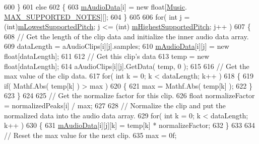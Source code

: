 \begin{DoxyCode}
600                 \}
601                 \textcolor{keywordflow}{else}
602                 \{
603                     \hyperlink{group___v_i_base_pro_var_ga52e76d9b74408660584676035a92a2c6}{mAudioData}[i] = \textcolor{keyword}{new} \textcolor{keywordtype}{float}[\hyperlink{class_music}{Music}.
      \hyperlink{group___music_constants_gaaf07da909a12e9fec0e43b70864f27b7}{MAX\_SUPPORTED\_NOTES}][];
604                 \}
605 
606                 \textcolor{keywordflow}{for}( \textcolor{keywordtype}{int} j = (\textcolor{keywordtype}{int})\hyperlink{group___v_i_base_pro_var_ga3cae52b1bcc0178a8a6b03c7aaf7aac8}{mLowestSupportedPitch}; j <= (int)
      \hyperlink{group___v_i_base_pro_var_ga61fb2c33b53a0f663047779d7ceb18f3}{mHighestSupportedPitch}; j++ )
607                 \{
608                     \textcolor{comment}{// Get the length of the clip data and initialize the inner audio data array. }
609                     dataLength = aAudioClips[i][j].samples;
610                     \hyperlink{group___v_i_base_pro_var_ga52e76d9b74408660584676035a92a2c6}{mAudioData}[i][j] = \textcolor{keyword}{new} \textcolor{keywordtype}{float}[dataLength];
611 
612                     \textcolor{comment}{// Get this clip's data}
613                     temp = \textcolor{keyword}{new} \textcolor{keywordtype}{float}[dataLength];
614                     aAudioClips[i][j].GetData( temp, 0 );
615 
616                     \textcolor{comment}{// Get the max value of the clip data.}
617                     \textcolor{keywordflow}{for}( \textcolor{keywordtype}{int} k = 0; k < dataLength; k++ )
618                     \{
619                         \textcolor{keywordflow}{if}( Mathf.Abs( temp[k] ) > max )
620                         \{
621                             max = Mathf.Abs( temp[k] );
622                         \}
623                     \}
624 
625                     \textcolor{comment}{// Get the normalize factor for this clip.}
626                     \textcolor{keywordtype}{float} normalizeFactor = normalizedPeaks[i] / max;
627 
628                     \textcolor{comment}{// Normalize the clip and put the normalized data into the audio data array.}
629                     \textcolor{keywordflow}{for}( \textcolor{keywordtype}{int} k = 0; k < dataLength; k++ )
630                     \{
631                         \hyperlink{group___v_i_base_pro_var_ga52e76d9b74408660584676035a92a2c6}{mAudioData}[i][j][k] = temp[k] * normalizeFactor;
632                     \}
633 
634                     \textcolor{comment}{// Reset the max value for the next clip.}
635                     max = 0f;

\end{DoxyCode}
